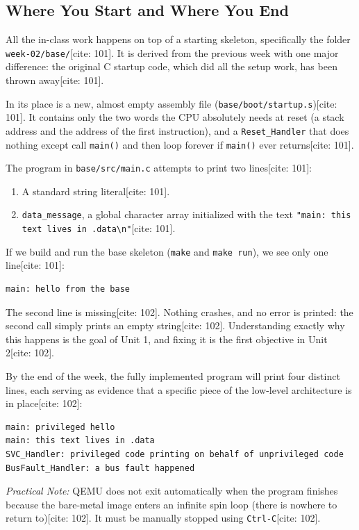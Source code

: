 \subsection{Where You Start and Where You End}
All the in-class work happens on top of a starting skeleton, specifically the folder \texttt{week-02/base/}[cite: 101]. It is derived from the previous week with one major difference: the original C startup code, which did all the setup work, has been thrown away[cite: 101]. 

In its place is a new, almost empty assembly file (\texttt{base/boot/startup.s})[cite: 101]. It contains only the two words the CPU absolutely needs at reset (a stack address and the address of the first instruction), and a \texttt{Reset\_Handler} that does nothing except call \texttt{main()} and then loop forever if \texttt{main()} ever returns[cite: 101].

The program in \texttt{base/src/main.c} attempts to print two lines[cite: 101]:
\begin{enumerate}
    \item A standard string literal[cite: 101].
    \item \texttt{data\_message}, a global character array initialized with the text \texttt{"main: this text lives in .data\textbackslash{}n"}[cite: 101].
\end{enumerate}

If we build and run the base skeleton (\texttt{make} and \texttt{make run}), we see only one line[cite: 101]:
\begin{lstlisting}[language=bash]
main: hello from the base
\end{lstlisting}

The second line is missing[cite: 102]. Nothing crashes, and no error is printed: the second call simply prints an empty string[cite: 102]. Understanding exactly why this happens is the goal of Unit 1, and fixing it is the first objective in Unit 2[cite: 102]. 

By the end of the week, the fully implemented program will print four distinct lines, each serving as evidence that a specific piece of the low-level architecture is in place[cite: 102]:
\begin{lstlisting}[language=bash]
main: privileged hello
main: this text lives in .data
SVC_Handler: privileged code printing on behalf of unprivileged code
BusFault_Handler: a bus fault happened
\end{lstlisting}

\textit{Practical Note:} QEMU does not exit automatically when the program finishes because the bare-metal image enters an infinite spin loop (there is nowhere to return to)[cite: 102]. It must be manually stopped using \texttt{Ctrl-C}[cite: 102].

